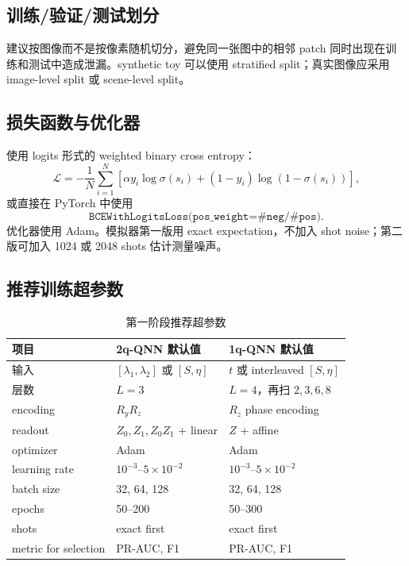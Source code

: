 \documentclass[UTF8,zihao=-4]{ctexart}
\begin{document}
\subsection{训练/验证/测试划分}

建议按图像而不是按像素随机切分，避免同一张图中的相邻 patch 同时出现在训练和测试中造成泄漏。synthetic toy 可以使用 stratified split；真实图像应采用 image-level split 或 scene-level split。

\subsection{损失函数与优化器}

使用 logits 形式的 weighted binary cross entropy：
\begin{equation}
    \mathcal{L}=-\frac{1}{N}\sum_{i=1}^N \left[\alpha y_i\log\sigma(s_i)+(1-y_i)\log(1-\sigma(s_i))\right],
\end{equation}
或直接在 PyTorch 中使用
\begin{equation}
    \texttt{BCEWithLogitsLoss(pos\_weight=\#neg/\#pos)}.
\end{equation}
优化器使用 Adam。模拟器第一版用 exact expectation，不加入 shot noise；第二版可加入 1024 或 2048 shots 估计测量噪声。

\subsection{推荐训练超参数}

\begin{table}[H]
\centering
\caption{第一阶段推荐超参数}
\begin{tabular}{lll}
\toprule
项目 & 2q-QNN 默认值 & 1q-QNN 默认值 \\
\midrule
输入 & $[\lambda_1,\lambda_2]$ 或 $[S,\eta]$ & $t$ 或 interleaved $[S,\eta]$ \\
层数 & $L=3$ & $L=4$，再扫 $2,3,6,8$ \\
encoding & $R_yR_z$ & $R_z$ phase encoding \\
readout & $Z_0,Z_1,Z_0Z_1$ + linear & $Z$ + affine \\
optimizer & Adam & Adam \\
learning rate & $10^{-3}$--$5\times10^{-2}$ & $10^{-3}$--$5\times10^{-2}$ \\
batch size & 32, 64, 128 & 32, 64, 128 \\
epochs & 50--200 & 50--300 \\
shots & exact first & exact first \\
metric for selection & PR-AUC, F1 & PR-AUC, F1 \\
\bottomrule
\end{tabular}
\end{table}
\end{document}
